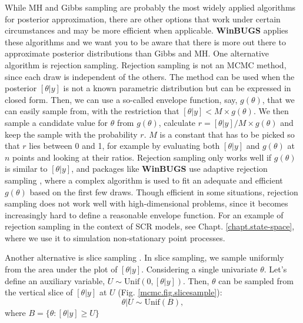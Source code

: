 While MH and Gibbs sampling are probably the most widely applied
algorithms for posterior approximation, there are other options that
work under certain circumstances and may be more efficient when
applicable. {\bf WinBUGS} applies these algorithms and we want you to be
aware that there is more out there to approximate posterior
distributions than Gibbs and MH.  One alternative algorithm is
rejection sampling. Rejection sampling is not an MCMC method, since
each draw is independent of the others. The method can be used when
the posterior $[\theta|y]$ is not a known parametric distribution but
can be expressed in closed form. Then, we can use a so-called envelope
function, say, $g(\theta)$, that we can easily sample from, with the
restriction that $[\theta|y] < M \times g(\theta)$. We then sample a
candidate value for $\theta$ from $g(\theta)$, calculate $r =
[\theta|y]/M \times g(\theta)$ and keep the sample with the probability
$r$. $M$ is a constant that has to be picked so that $r$ lies between
0 and 1, for example by evaluating both $[\theta|y]$ and $g(\theta)$
at $n$ points and looking at their ratios. Rejection sampling only
works well if $g(\theta)$ is similar to $[\theta|y]$, and packages
like {\bf WinBUGS} use adaptive rejection sampling \citep{gilks_wild:1992},
where a complex algorithm is used to fit an adequate and efficient
$g(\theta)$ based on the first few draws.
Though efficient in some
situations, rejection sampling does not work well with
high-dimensional problems, since it becomes increasingly hard to
define a reasonable envelope function. For an example of rejection
sampling in the context of SCR models, see
Chapt. \ref{chapt.state-space}, where we use it to simulation
non-stationary point processes.

Another alternative is slice sampling
\citep{neal:2003}. In slice sampling, we sample uniformly from the
area under the plot of $[\theta|y]$. Considering a single univariate
$\theta$. Let's define an auxiliary variable, $U \sim \mbox{Unif}(0,
[\theta|y])$. Then, $\theta$ can be sampled from the vertical slice
of $[\theta|y]$ at $U$ (Fig. \ref{mcmc.fig.slicesample}):
\[
\theta|U \sim \mbox{Unif}(B),
\]
where $B = \{\theta: [\theta|y] \geq U\}$

